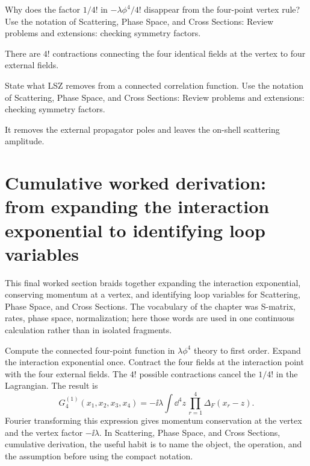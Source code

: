 \begin{exercise}
Why does the factor \(1/4!\) in \(-\lambda\phi^4/4!\) disappear from the four-point vertex rule?  Use the notation of Scattering, Phase Space, and Cross Sections: Review problems and extensions: checking symmetry factors.
\begin{answer}
There are \(4!\) contractions connecting the four identical fields at the vertex to four external fields.
\end{answer}
\end{exercise}

\begin{exercise}
State what LSZ removes from a connected correlation function.  Use the notation of Scattering, Phase Space, and Cross Sections: Review problems and extensions: checking symmetry factors.
\begin{answer}
It removes the external propagator poles and leaves the on-shell scattering amplitude.
\end{answer}
\end{exercise}



\section{Cumulative worked derivation: from expanding the interaction exponential to identifying loop variables}

This final worked section braids together expanding the interaction exponential, conserving momentum at a vertex, and identifying loop variables for Scattering, Phase Space, and Cross Sections.  The vocabulary of the chapter was S-matrix, rates, phase space, normalization; here those words are used in one continuous calculation rather than in isolated fragments.

Compute the connected four-point function in \(\lambda\phi^4\) theory to first order.  Expand the interaction exponential once.  Contract the four fields at the interaction point with the four external fields.  The \(4!\) possible contractions cancel the \(1/4!\) in the Lagrangian.  The result is
\[
  G_4^{(1)}(x_1,x_2,x_3,x_4)=
  -\ii\lambda\int\dd^4z\,\prod_{r=1}^4\Delta_F(x_r-z).
\]
Fourier transforming this expression gives momentum conservation at the vertex and the vertex factor \(-\ii\lambda\).  In Scattering, Phase Space, and Cross Sections, cumulative derivation, the useful habit is to name the object, the operation, and the assumption before using the compact notation.

